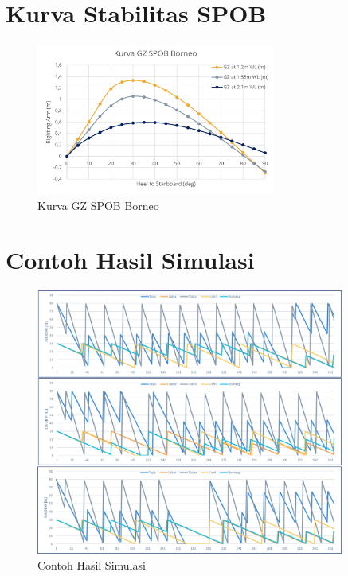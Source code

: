 \section*{Kurva Stabilitas SPOB}
\label{sec:kurva-gz-spob}

\begin{figure}
    \centering
    \includegraphics[width=0.7\textwidth]{grafik/kurva-gz-spob.jpg}
    \caption*{Kurva GZ SPOB Borneo}
    \label{fig:kurva-gz-spob}
\end{figure}

\section*{Contoh Hasil Simulasi}
\label{sec:contoh-hasil-simulasi}

\begin{figure}
    \centering
    \includegraphics[width=0.9\textwidth]{grafik/contoh-hasil-simulasi.jpg}
    \caption*{Contoh Hasil Simulasi}
    \label{fig:contoh-simulasi}
\end{figure}

